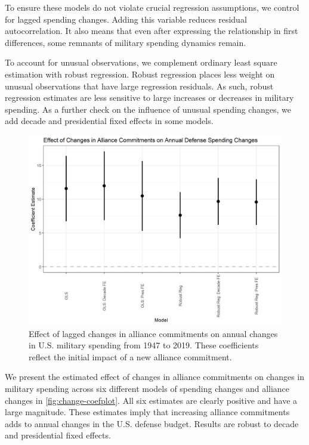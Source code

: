 \documentclass[12pt]{article}
\begin{document}
To ensure these models do not violate crucial regression assumptions, we control for lagged spending changes. 
Adding this variable reduces residual autocorrelation. 
It also means that even after expressing the relationship in first differences, some remnants of military spending dynamics remain. 


To account for unusual observations, we complement ordinary least square estimation with robust regression. 
Robust regression places less weight on unusual observations that have large regression residuals.
As such, robust regression estimates are less sensitive to large increases or decreases in military spending. 
As a further check on the influence of unusual spending changes, we add decade and presidential fixed effects in some models. 


\begin{figure} 
\includegraphics[width = .95\textwidth]{change-coefplot.png}
\caption{Effect of lagged changes in alliance commitments on annual changes in U.S. military spending from 1947 to 2019.
These coefficients reflect the initial impact of a new alliance commitment.}
\label{fig:change-coefplot}
\end{figure}


We present the estimated effect of changes in alliance commitments on changes in military spending across six different models of spending changes and alliance changes in \autoref{fig:change-coefplot}. 
All six estimates are clearly positive and have a large magnitude. 
These estimates imply that increasing alliance commitments adds to annual changes in the U.S. defense budget. 
Results are robust to decade and presidential fixed effects. 
\end{document}
